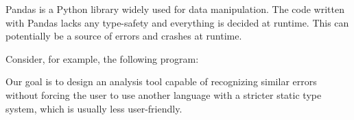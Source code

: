 \large
Pandas is a Python library widely used for data manipulation. %
The code written with Pandas lacks any type-safety and everything is decided at runtime.
This can potentially be a source of errors and crashes at runtime.

Consider, for example, the following program:



Our goal is to design an analysis tool capable of recognizing similar errors without forcing the user
to use another language with a stricter static type system, which is usually less user-friendly.

